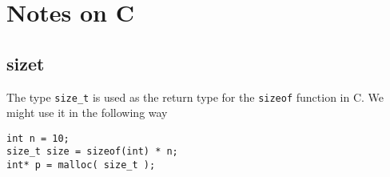 
\chapter{Notes on C}
\label{cha:appendix}

\section{size\textunderscore t}
\label{sec:size_t}

The type \verb=size_t= is used as the return type for the
\verb=sizeof= function in C. We might use it in the following way
\begin{lstlisting}
int n = 10;
size_t size = sizeof(int) * n;
int* p = malloc( size_t );
\end{lstlisting}


